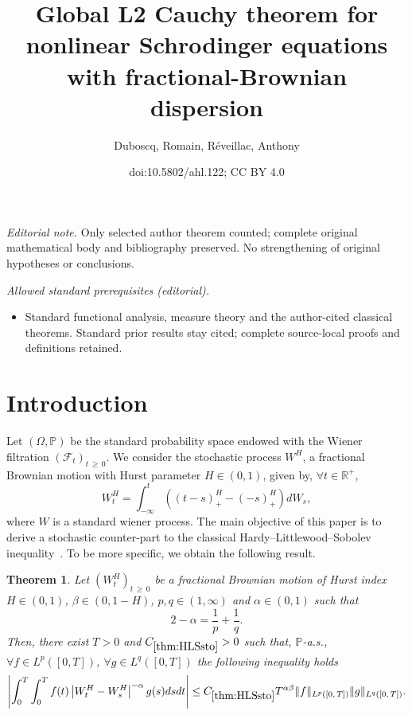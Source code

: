 \documentclass[10pt]{amsart}
\title{Global L2 Cauchy theorem for nonlinear Schrodinger equations with fractional-Brownian dispersion}
\author{Duboscq, Romain, Réveillac, Anthony}
\date{doi:10.5802/ahl.122; CC BY 4.0}
\newtheorem{theo}{Theorem}[section]
\theoremstyle{definition}\newtheorem{defi}[theo]{Definition}\newtheorem{rema}[theo]{Remark}\newtheorem{exam}[theo]{Example}\newtheorem{exem}[theo]{Example}\newtheorem{nota}[theo]{Notation}
\newcommand{\bbP}{\mathbb{P}}
\newcommand{\bbR}{\mathbb{R}}
\newcommand{\clF}{\mathcal{F}}
\let\oldforall\forall
\renewcommand*{\forall}{\mathrel{\oldforall}}
\begin{document}
\maketitle
\noindent\textit{Editorial note.} Only selected author theorem counted; complete original mathematical body and bibliography preserved. No strengthening of original hypotheses or conclusions.\par\medskip
\noindent\textit{Allowed standard prerequisites (editorial).}\begin{itemize}
\item Standard functional analysis, measure theory and the author-cited classical theorems. Standard prior results stay cited; complete source-local proofs and definitions retained.
\end{itemize}\medskip

\section{Introduction}

Let $(\Omega, \bbP)$ be the standard probability space endowed with the Wiener filtration $(\clF_t)_{t\,\geq\,0}$. We consider the stochastic process $W^H$, a fractional Brownian motion with Hurst parameter $H\in(0,1)$, given by, $\forall t\in\bbR^+$,
\[
W^H_t = \int_{-\infty}^t\left((t-s)_+^{H}-(-s)_+^{H}\right)dW_s,
\]
where $W$ is a standard wiener process. The main objective of this paper is to derive a stochastic counter-part to the classical Hardy--Littlewood--Sobolev inequality~\cite{hardy1928some,hardy1932some,sobolev1938theorem}. To be more specific, we obtain the following result.

\begin{theo}\label{thm:HLSsto}
Let $(W^H_t)_{t\,\geq\,0}$ be a fractional Brownian motion of Hurst index $H\in (0,1)$, $\beta\in (0,1-H)$, $p,q \in (1,\infty)$ and $\alpha\in (0,1)$ such that
\[
2 - \alpha = \frac1p+\frac1q.
\]
Then, there exist $T>0$ and $C_{\ref{thm:HLSsto}}>0$ such that, $\bbP$-a.s., $\forall f\in L^p([0,T])$, $\forall g\in L^q([0,T])$ the following inequality holds
\begin{equation}\label{ineq:HLSsto}
\left|\int_0^T\int_0^T f(t)\left|W^{H}_t-W^{H}_s\right|^{-\alpha}g(s) ds dt\right|\leq C_{\ref{thm:HLSsto}} T^{\alpha\beta}\|f\|_{L^p\left([0,\,T]\right)}\|g\|_{L^q\left([0,\,T]\right)}.
\end{equation}
\end{theo}
\end{document}
